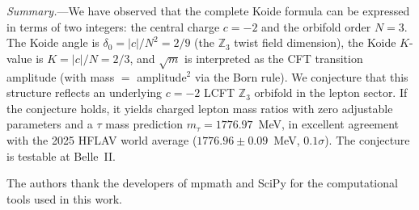 \documentclass[aps,prl,twocolumn,superscriptaddress]{revtex4-2}
\begin{document}
\emph{Summary.}---We have observed that the complete Koide formula can be expressed in
terms of two integers: the central charge $c = -2$ and the orbifold order $N = 3$.
The Koide angle is $\delta_0 = |c|/N^2 = 2/9$ (the $\mathbb{Z}_3$ twist field
dimension), the Koide $K$-value is $K = |c|/N = 2/3$, and $\sqrt{m}$ is interpreted as
the CFT transition amplitude (with mass $=$ amplitude$^2$ via the Born rule). We
conjecture that this structure reflects an underlying $c = -2$ LCFT $\mathbb{Z}_3$
orbifold in the lepton sector. If the conjecture holds, it yields charged lepton mass
ratios with zero adjustable parameters and a $\tau$ mass prediction
$m_\tau = 1776.97$~MeV, in excellent agreement with the 2025 HFLAV world average
($1776.96 \pm 0.09$~MeV, $0.1\sigma$). The conjecture is testable at Belle~II.

\begin{acknowledgments}
The authors thank the developers of mpmath and SciPy for the computational tools
used in this work.
\end{acknowledgments}
\end{document}
